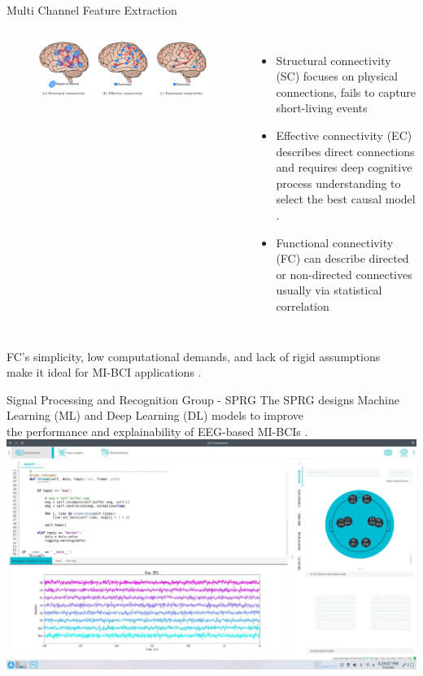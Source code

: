 \documentclass[aspectratio=169]{beamer}
\let\oldcite\cite %
\renewcommand{\cite}[1]{{\tiny\oldcite{#1}}}
\begin{document}
\begin{frame}{Multi Channel Feature Extraction}
    \begin{columns}
            \begin{figure}[!ht]
                \centering
                \includegraphics[width=1\linewidth]{figures/connectivities.png}
            \end{figure}
            \begin{itemize}
                \item Structural connectivity (SC) focuses on physical connections, fails to capture short-living events \cite{thiebaut2020brain}
                \item Effective connectivity (EC) describes direct connections and requires deep cognitive process understanding to select the best causal model \cite{chiarion2023connectivity}.
                \item Functional connectivity (FC) can describe directed or non-directed connectives usually via statistical correlation \cite{cao2022brain}
            \end{itemize}
    \end{columns}
    \vspace{3em}
    \centering
    FC's simplicity, low computational demands, and lack of rigid assumptions\\ make it ideal for MI-BCI applications \cite{he2019electrophysiological}.
\end{frame}

\begin{frame}{Signal Processing and Recognition Group - SPRG}
    \centering
    The SPRG designs Machine Learning (ML) and Deep Learning (DL) models to improve\\ the performance and explainability of EEG-based MI-BCIs \cite{collazos2023posthoc}.
    \centering
    \includegraphics[width=0.7\linewidth]{figures/bcisoft.jpeg}
\end{frame}
\end{document}
